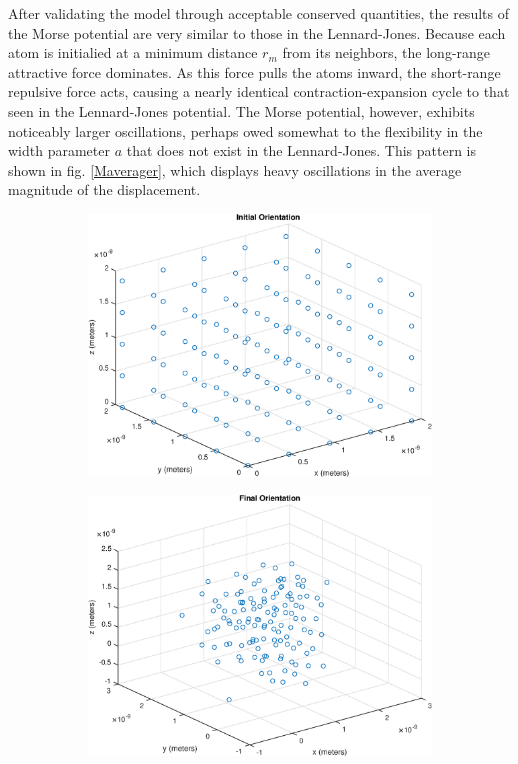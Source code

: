 \documentclass[12pt]{article}
\begin{document}
After validating the model through acceptable conserved quantities, the results of the Morse potential are very similar to those in the Lennard-Jones.  Because each atom is initialied at a minimum distance $r_m$ from its neighbors, the long-range attractive force dominates.  As this force pulls the atoms inward, the short-range repulsive force acts, causing a nearly identical contraction-expansion cycle to that seen in the Lennard-Jones potential.  The Morse potential, however, exhibits noticeably larger oscillations, perhaps owed somewhat to the flexibility in the width parameter $a$ that does not exist in the Lennard-Jones.  This pattern is shown in fig. \ref{Maverager}, which displays heavy oscillations in the average magnitude of the displacement.

\begin{figure}[!h]
\begin{subfigure}{0.5\textwidth}
\includegraphics[width=0.9\linewidth]{./finalpics/Minitial.eps}
\caption{\label{Minitial}}
\end{subfigure}
\begin{subfigure}{0.5\textwidth}
\includegraphics[width=0.9\linewidth]{./finalpics/Mfinal.eps}

\end{subfigure}
\end{figure}
\end{document}
